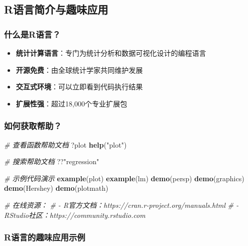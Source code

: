 \documentclass[
]{book}
\newenvironment{Shaded}{\begin{snugshade}}{\end{snugshade}}
\newcommand{\CommentTok}[1]{\textcolor[rgb]{0.56,0.35,0.01}{\textit{#1}}}
\newcommand{\FunctionTok}[1]{\textcolor[rgb]{0.13,0.29,0.53}{\textbf{#1}}}
\newcommand{\NormalTok}[1]{#1}
\newcommand{\StringTok}[1]{\textcolor[rgb]{0.31,0.60,0.02}{#1}}
\providecommand{\tightlist}{%
  \setlength{\itemsep}{0pt}\setlength{\parskip}{0pt}}
\begin{document}
\hypertarget{rux8bedux8a00ux7b80ux4ecbux4e0eux8da3ux5473ux5e94ux7528}{%
\subsection{R语言简介与趣味应用}\label{rux8bedux8a00ux7b80ux4ecbux4e0eux8da3ux5473ux5e94ux7528}}

\hypertarget{ux4ec0ux4e48ux662frux8bedux8a00}{%
\subsubsection{什么是R语言？}\label{ux4ec0ux4e48ux662frux8bedux8a00}}

\begin{itemize}
\tightlist
\item
  \textbf{统计计算语言}：专门为统计分析和数据可视化设计的编程语言
\item
  \textbf{开源免费}：由全球统计学家共同维护发展
\item
  \textbf{交互式环境}：可以立即看到代码执行结果
\item
  \textbf{扩展性强}：超过18,000个专业扩展包
\end{itemize}

\hypertarget{ux5982ux4f55ux83b7ux53d6ux5e2eux52a9}{%
\subsubsection{如何获取帮助？}\label{ux5982ux4f55ux83b7ux53d6ux5e2eux52a9}}

\begin{Shaded}
\begin{Highlighting}[]
\CommentTok{\# 查看函数帮助文档}
\NormalTok{?plot}
\FunctionTok{help}\NormalTok{(}\StringTok{"plot"}\NormalTok{)}

\CommentTok{\# 搜索帮助文档}
\NormalTok{??}\StringTok{"regression"}

\CommentTok{\# 示例代码演示}
\FunctionTok{example}\NormalTok{(plot)}
\FunctionTok{example}\NormalTok{(lm)}
\FunctionTok{demo}\NormalTok{(persp)}
\FunctionTok{demo}\NormalTok{(graphics)}
\FunctionTok{demo}\NormalTok{(Hershey)}
\FunctionTok{demo}\NormalTok{(plotmath)}


\CommentTok{\# 在线资源：}
\CommentTok{\# {-} R官方文档：https://cran.r{-}project.org/manuals.html}
\CommentTok{\# {-} RStudio社区：https://community.rstudio.com}
\end{Highlighting}
\end{Shaded}

\hypertarget{rux8bedux8a00ux7684ux8da3ux5473ux5e94ux7528ux793aux4f8b}{%
\subsubsection{R语言的趣味应用示例}\label{rux8bedux8a00ux7684ux8da3ux5473ux5e94ux7528ux793aux4f8b}}
\end{document}
